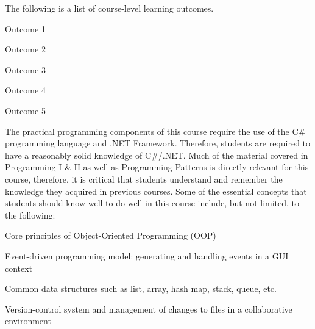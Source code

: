 \documentclass[11pt, a4paper]{article}
\begin{document}

\noindent The following is a list of course-level learning outcomes.  

\begin{filledstarlist}
	\item Outcome 1
	\item Outcome 2
	\item Outcome 3
	\item Outcome 4
	\item Outcome 5
\end{filledstarlist}

\clearpage
{}
\noindent The practical programming components of this course require the use of the C\# programming language and .NET Framework. Therefore, students are required to have a reasonably solid knowledge of C\#/.NET. Much of the material covered in Programming I \& II as well as Programming Patterns is directly relevant for this course, therefore, it is critical that students understand and remember the knowledge they acquired in previous courses. Some of the essential concepts that students should know well to do well in this course include, but not limited, to the following:
\begin{greenrectangles}
	\item Core principles of Object-Oriented Programming (OOP) 
	\item Event-driven programming model: generating and handling events in a GUI context 
	\item Common data structures such as list, array, hash map, stack, queue, etc. 
   \item Version-control system and management of changes to files in a collaborative environment
\end{greenrectangles}
\end{document}
